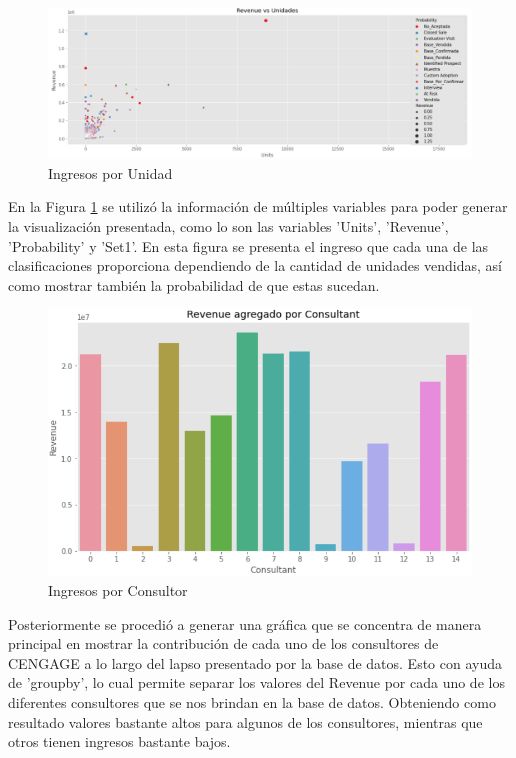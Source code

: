 \documentclass{article}
\begin{document}
        \newpage

        \begin{figure}[h!]
            \centering
            \includegraphics[width = \columnwidth]{img/revenue_unit.png}
            \caption{Ingresos por Unidad}
            \label{fig:revUnit}
        \end{figure}

        En la Figura \ref{fig:revUnit} se utilizó la información de múltiples variables para poder generar la visualización presentada, como lo son las variables 'Units', 'Revenue', 'Probability' y 'Set1'. En esta figura se presenta el ingreso que cada una de las clasificaciones proporciona dependiendo de la cantidad de unidades vendidas, así como mostrar también la probabilidad de que estas sucedan.

        \vspace{3mm}

        \begin{figure}[h!]
            \centering
            \includegraphics[width = \columnwidth]{img/revenue_consultant.png}
            \caption{Ingresos por Consultor}
            \label{fig:revConsultor}
        \end{figure}

        Posteriormente se procedió a generar una gráfica que se concentra de manera principal en mostrar la contribución de cada uno de los consultores de CENGAGE a lo largo del lapso presentado por la base de datos. Esto con ayuda de 'groupby', lo cual permite separar los valores del Revenue por cada uno de los diferentes consultores que se nos brindan en la base de datos. Obteniendo como resultado valores bastante altos para algunos de los consultores, mientras que otros tienen ingresos bastante bajos.
\end{document}
